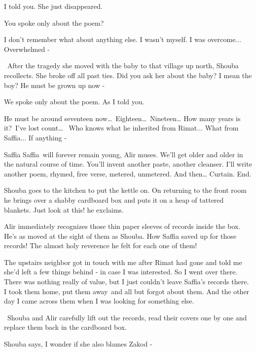\documentclass[twoside,11pt]{book}
\begin{document}
{\textquotedbl}I told you. She just disappeared.{\textquotedbl} 

{\textquotedbl}You spoke only about the poem?{\textquotedbl}\ 

{\textquotedbl}I don't remember what about anything else. I wasn't myself. I was overcome... Overwhelmed
-{\textquotedbl} 

~{\textquotedbl}After the tragedy she moved with the baby to that village up north,{\textquotedbl} Shouba recollects.
{\textquotedbl}She broke off all past ties. Did you ask her about the baby? I mean the boy? He must be grown up now -
{\textquotedbl} 

{\textquotedbl}We spoke only about the poem. As I told you.{\textquotedbl} 

{\textquotedbl}He must be around seventeen now{\dots}\ Eighteen{\dots}\ Nineteen{\dots} How many years is it?\ I've lost
count{\dots} ~Who knows what he inherited from Rimat... What from Saffia... If anything -{\textquotedbl} 

{\textquotedbl}Saffia Saffia\ will forever remain young,{\textquotedbl} Alir muses. {\textquotedbl}We'll get older and
older in the natural course of time. You'll invent another paste, another cleanser. I'll write another poem, rhymed,
free verse, metered, unmetered. And then{\dots} Curtain. End.{\textquotedbl}

Shouba goes to the kitchen to put the kettle on. On returning to the front room he brings over a shabby cardboard box
and puts it on a heap of tattered blankets. {\textquotedbl}Just look at this!{\textquotedbl} he exclaims.

Alir immediately recognizes those thin paper sleeves of records inside the box. He's as moved at the sight of them as
Shouba. {\textquotedbl}How Saffia saved up for those records! The almost holy reverence he felt for each one of
them!{\textquotedbl} 

{\textquotedbl}The upstairs neighbor got in touch with me after Rimat had gone and told me she'd left a few things
behind - in case I was interested. So I went over there. There was nothing really of value, but I just couldn't leave
Saffia's records there. I took them home, put them away~and all but forgot about them. And the other day I came across
them when I was looking for something else.{\textquotedbl}

~Shouba and Alir carefully lift out the records, read their covers one by one and replace them back in the cardboard
box. 

Shouba says, {\textquotedbl}I wonder if she also blames Zakod -{\textquotedbl} 
\end{document}
